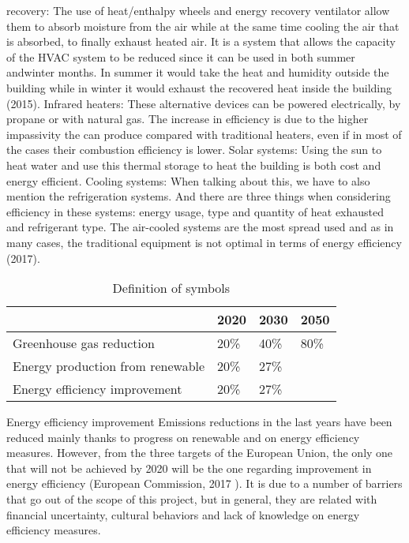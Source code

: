 recovery: The use of heat/enthalpy wheels and energy recovery ventilator allow them to absorb moisture from the air while at the same time cooling the air that is absorbed, to finally exhaust heated air. It is a system that allows the capacity of the HVAC system to be reduced since it can be used in both summer andwinter months. In summer it would take the heat and humidity outside the building while in winter it would exhaust the recovered heat inside the building (2015). Infrared heaters: These alternative devices can be powered electrically, by propane or with natural gas. The increase in efficiency is due to the higher impassivity the can produce compared with traditional heaters, even if in most of the cases their combustion efficiency is lower. Solar systems: Using the sun to heat water and use this thermal storage to heat the building is both cost and energy efficient. Cooling systems: When talking about this, we have to also mention the refrigeration systems. And there are three things when considering efficiency in these systems: energy usage, type and quantity of heat exhausted and refrigerant type. The air-cooled systems are the most spread used and as in many cases, the traditional equipment is not optimal in terms of energy efficiency (2017).

\begin{table}[H]
\centering
\caption{Definition of symbols \cite{Watson2018}}
\label{table:symbols}
\begin{tabular}{llll}
\hline
& 2020 & 2030 & 2050 \\ \hline
Greenhouse gas reduction & 20\% & 40\%  & 80\% \\
Energy production from renewable & 20\% & 27\% & \\
Energy efficiency improvement & 20\% & 27\% & \\ \hline
\end{tabular}

\end{table}

Energy efficiency improvement Emissions reductions in the last years have been reduced mainly thanks to progress on renewable and on energy efficiency measures. However, from the three targets of the European Union, the only one that will not be achieved by 2020 will be the one regarding improvement in energy efficiency (European Commission, 2017 \cite{European2013}). It is due to a number of barriers that go out of the scope of this project, but in general, they are related with financial uncertainty, cultural behaviors and lack of knowledge on energy efficiency measures.

